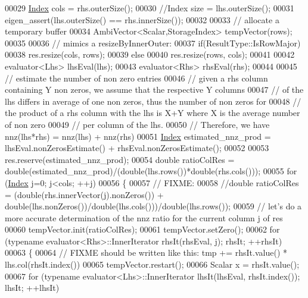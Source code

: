\begin{DoxyCode}
00029   \hyperlink{namespace_eigen_a62e77e0933482dafde8fe197d9a2cfde}{Index} cols = rhs.outerSize();
00030   \textcolor{comment}{//Index size = lhs.outerSize();}
00031   eigen\_assert(lhs.outerSize() == rhs.innerSize());
00032 
00033   \textcolor{comment}{// allocate a temporary buffer}
00034   AmbiVector<Scalar,StorageIndex> tempVector(rows);
00035 
00036   \textcolor{comment}{// mimics a resizeByInnerOuter:}
00037   \textcolor{keywordflow}{if}(ResultType::IsRowMajor)
00038     res.resize(cols, rows);
00039   \textcolor{keywordflow}{else}
00040     res.resize(rows, cols);
00041   
00042   evaluator<Lhs> lhsEval(lhs);
00043   evaluator<Rhs> rhsEval(rhs);
00044   
00045   \textcolor{comment}{// estimate the number of non zero entries}
00046   \textcolor{comment}{// given a rhs column containing Y non zeros, we assume that the respective Y columns}
00047   \textcolor{comment}{// of the lhs differs in average of one non zeros, thus the number of non zeros for}
00048   \textcolor{comment}{// the product of a rhs column with the lhs is X+Y where X is the average number of non zero}
00049   \textcolor{comment}{// per column of the lhs.}
00050   \textcolor{comment}{// Therefore, we have nnz(lhs*rhs) = nnz(lhs) + nnz(rhs)}
00051   \hyperlink{namespace_eigen_a62e77e0933482dafde8fe197d9a2cfde}{Index} estimated\_nnz\_prod = lhsEval.nonZerosEstimate() + rhsEval.nonZerosEstimate();
00052 
00053   res.reserve(estimated\_nnz\_prod);
00054   \textcolor{keywordtype}{double} ratioColRes = double(estimated\_nnz\_prod)/(double(lhs.rows())*\textcolor{keywordtype}{double}(rhs.cols()));
00055   \textcolor{keywordflow}{for} (\hyperlink{namespace_eigen_a62e77e0933482dafde8fe197d9a2cfde}{Index} j=0; j<cols; ++j)
00056   \{
00057     \textcolor{comment}{// FIXME:}
00058     \textcolor{comment}{//double ratioColRes = (double(rhs.innerVector(j).nonZeros()) +
       double(lhs.nonZeros())/double(lhs.cols()))/double(lhs.rows());}
00059     \textcolor{comment}{// let's do a more accurate determination of the nnz ratio for the current column j of res}
00060     tempVector.init(ratioColRes);
00061     tempVector.setZero();
00062     \textcolor{keywordflow}{for} (\textcolor{keyword}{typename} evaluator<Rhs>::InnerIterator rhsIt(rhsEval, j); rhsIt; ++rhsIt)
00063     \{
00064       \textcolor{comment}{// FIXME should be written like this: tmp += rhsIt.value() * lhs.col(rhsIt.index())}
00065       tempVector.restart();
00066       Scalar x = rhsIt.value();
00067       \textcolor{keywordflow}{for} (\textcolor{keyword}{typename} evaluator<Lhs>::InnerIterator lhsIt(lhsEval, rhsIt.index()); lhsIt; ++lhsIt)

\end{DoxyCode}
